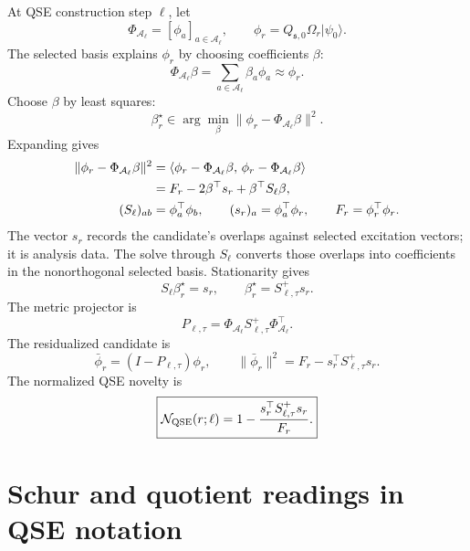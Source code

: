 \documentclass[10pt,twocolumn]{article}
\newcommand{\nov}{\mathcal N}
\newcommand{\ket}[1]{\lvert #1\rangle}
\begin{document}
At QSE construction step \(\ell\), let
\begin{equation}
\Phi_{\mathcal A_\ell}=[\phi_a]_{a\in\mathcal A_\ell},
\qquad
\phi_r=Q_{\mathfrak s,0}\Omega_r\ket{\psi_0}.
\label{eq:p3_basis_candidate}
\end{equation}
The selected basis explains \(\phi_r\) by choosing coefficients \(\beta\):
\begin{equation}
\Phi_{\mathcal A_\ell}\beta=\sum_{a\in\mathcal A_\ell}\beta_a\phi_a\approx\phi_r.
\label{eq:p3_synthesis}
\end{equation}
Choose \(\beta\) by least squares:
\begin{equation}
\beta_r^\star\in\arg\min_\beta
\|\phi_r-\Phi_{\mathcal A_\ell}\beta\|^2.
\label{eq:p3_ls}
\end{equation}
Expanding gives
\begin{align}
\|\phi_r-\Phi_{\mathcal A_\ell}\beta\|^2
&=\langle\phi_r-\Phi_{\mathcal A_\ell}\beta,\,
\phi_r-\Phi_{\mathcal A_\ell}\beta\rangle
\notag\\
&=F_r-2\beta^\top s_r+\beta^\top S_\ell\beta,
\label{eq:p3_expand}\\
(S_\ell)_{ab}&=\phi_a^\top\phi_b,
\qquad
(s_r)_a=\phi_a^\top\phi_r,
\qquad
F_r=\phi_r^\top\phi_r.
\label{eq:p3_SsF}
\end{align}
The vector \(s_r\) records the candidate's overlaps against selected excitation vectors; it is analysis data. The solve through \(S_\ell\) converts those overlaps into coefficients in the nonorthogonal selected basis.
Stationarity gives
\begin{equation}
S_\ell\beta_r^\star=s_r,
\qquad
\beta_r^\star=S_{\ell,\tau}^+s_r.
\label{eq:p3_normal}
\end{equation}
The metric projector is
\begin{equation}
P_{\ell,\tau}=\Phi_{\mathcal A_\ell}S_{\ell,\tau}^+\Phi_{\mathcal A_\ell}^\top.
\label{eq:p3_projector}
\end{equation}
The residualized candidate is
\begin{equation}
\bar\phi_r=(I-P_{\ell,\tau})\phi_r,
\qquad
\|\bar\phi_r\|^2=F_r-s_r^\top S_{\ell,\tau}^+s_r.
\label{eq:p3_residualized_candidate}
\end{equation}
The normalized QSE novelty is
\begin{equation}
\boxed{
\nov_{\rm QSE}(r;\ell)=1-\frac{s_r^\top S_{\ell,\tau}^+s_r}{F_r}.
}
\label{eq:p3_novelty}
\end{equation}

\section{Schur and quotient readings in QSE notation}
\end{document}
